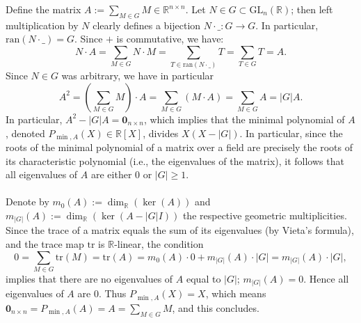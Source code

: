 \begin{solution}
    Define the matrix \( A := \sum_{M \in G} M \in \mathbb{R}^{n \times n} \). Let \( N \in G \subset \mathrm{GL}_n\left( \mathbb{R} \right) \); then left multiplication by \( N \) clearly defines a bijection \( N \cdot \_: G \rightarrow G \). In particular, \( \mathrm{ran}\left( N \cdot \_ \right) = G \). Since \( + \) is commutative, we have:
    \[
        N \cdot A = \sum_{M \in G} N \cdot M = \sum_{T \in \mathrm{ran}\left( N \cdot \_ \right)} T = \sum_{T \in G} T = A.
    \]
    Since \( N \in G \) was arbitrary, we have in particular
    \[
        A^{2} = \left( \sum_{M \in G} M \right) \cdot A = \sum_{M \in G} \left( M \cdot A \right) = \sum_{M \in G} A = \left| G \right| A.
    \]
    In particular, \( A^{2} - \left| G \right| A = \mathbf{0}_{n \times n} \), which implies that the minimal polynomial of \( A \), denoted \( P_{\min, A}\left(X\right) \in \mathbb{R}\left[X\right] \), divides \( X\left( X - \left| G \right| \right) \). In particular, since the roots of the minimal polynomial of a matrix over a field are precisely the roots of its characteristic polynomial (i.e., the eigenvalues of the matrix), it follows that all eigenvalues of \( A \) are either \( 0 \) or \( \left| G \right| \geq 1 \).
    \\\\
    Denote by \( m_0\left(A\right) := \dim_{\mathbb{R}} \left( \ker\left( A \right) \right) \) and \( m_{\left| G \right|}\left(A\right) := \dim_{\mathbb{R}} \left( \ker\left( A - \left| G \right| I \right) \right) \) the respective geometric multiplicities. Since the trace of a matrix equals the sum of its eigenvalues (by Vieta's formula), and the trace map \( \mathrm{tr} \) is \( \mathbb{R} \)-linear, the condition
    \[
        0 = \sum_{M \in G} \mathrm{tr}\left( M \right) = \mathrm{tr}\left( A \right) = m_{0}\left(A\right) \cdot 0 + m_{\left| G \right|}\left(A\right) \cdot \left| G \right| = m_{\left| G \right|}\left(A\right) \cdot \left| G \right|,
    \]
    implies that there are no eigenvalues of \( A \) equal to \( \left| G \right| \); \( m_{\left| G \right|}\left(A\right) = 0 \). Hence all eigenvalues of \( A \) are \( 0 \). Thus \( P_{\min, A}\left(X\right) = X \), which means \( \mathbf{0}_{n \times n} = P_{\min, A}\left(A\right) = A = \sum_{M \in G} M \), and this concludes.
\end{solution}
